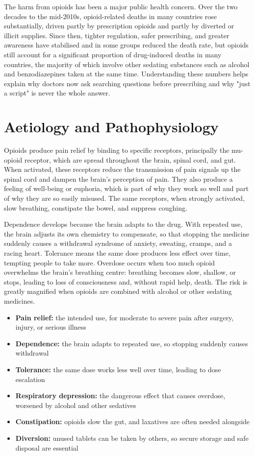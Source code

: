 The harm from opioids has been a major public health concern. Over the two decades to the mid-2010s, opioid-related deaths in many countries rose substantially, driven partly by prescription opioids and partly by diverted or illicit supplies. Since then, tighter regulation, safer prescribing, and greater awareness have stabilised and in some groups reduced the death rate, but opioids still account for a significant proportion of drug-induced deaths in many countries, the majority of which involve other sedating substances such as alcohol and benzodiazepines taken at the same time. Understanding these numbers helps explain why doctors now ask searching questions before prescribing and why "just a script" is never the whole answer.

\section*{Aetiology and Pathophysiology}
Opioids produce pain relief by binding to specific receptors, principally the mu-opioid receptor, which are spread throughout the brain, spinal cord, and gut. When activated, these receptors reduce the transmission of pain signals up the spinal cord and dampen the brain's perception of pain. They also produce a feeling of well-being or euphoria, which is part of why they work so well and part of why they are so easily misused. The same receptors, when strongly activated, slow breathing, constipate the bowel, and suppress coughing.

Dependence develops because the brain adapts to the drug. With repeated use, the brain adjusts its own chemistry to compensate, so that stopping the medicine suddenly causes a withdrawal syndrome of anxiety, sweating, cramps, and a racing heart. Tolerance means the same dose produces less effect over time, tempting people to take more. Overdose occurs when too much opioid overwhelms the brain's breathing centre: breathing becomes slow, shallow, or stops, leading to loss of consciousness and, without rapid help, death. The risk is greatly magnified when opioids are combined with alcohol or other sedating medicines.

\begin{itemize}
    \item \textbf{Pain relief:} the intended use, for moderate to severe pain after surgery, injury, or serious illness
    \item \textbf{Dependence:} the brain adapts to repeated use, so stopping suddenly causes withdrawal
    \item \textbf{Tolerance:} the same dose works less well over time, leading to dose escalation
    \item \textbf{Respiratory depression:} the dangerous effect that causes overdose, worsened by alcohol and other sedatives
    \item \textbf{Constipation:} opioids slow the gut, and laxatives are often needed alongside
    \item \textbf{Diversion:} unused tablets can be taken by others, so secure storage and safe disposal are essential
\end{itemize}

